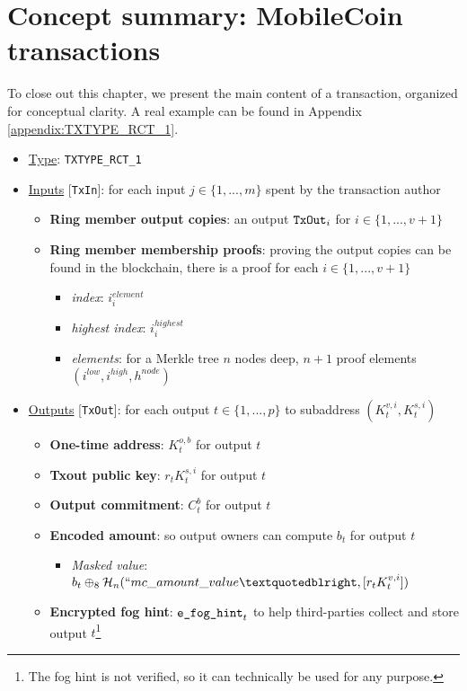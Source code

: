 \newpage
\section{Concept summary: MobileCoin transactions}
\label{sec:transaction_summary}

To close out this chapter, we present the main content of a transaction, organized for conceptual clarity. A real example can be found in Appendix \ref{appendix:TXTYPE_RCT_1}.

\begin{itemize}
    \item \underline{Type}: {\tt TXTYPE\_RCT\_1}
    \item \underline{Inputs} [{\tt TxIn}]: for each input $j \in \{1,...,m\}$ spent by the transaction author
    \begin{itemize}
        \item \textbf{Ring member output copies}: an output $\textrm{{\tt TxOut}}_i$ for $i \in \{1,...,v+1\}$
        \item \textbf{Ring member membership proofs}: proving the output copies can be found in the blockchain, there is a proof for each $i \in \{1,...,v+1\}$
        \begin{itemize}
            \item \textit{index}: $i^{element}_i$
            \item \textit{highest index}: $i^{highest}_i$
            \item \textit{elements}: for a Merkle tree $n$ nodes deep, $n+1$ proof elements $(i^{low}, i^{high}, h^{node})$
        \end{itemize}
    \end{itemize}

    \item \underline{Outputs} [{\tt TxOut}]: for each output $t \in \{1,...,p\}$ to subaddress $(K^{v,i}_t,K^{s,i}_t)$
    \begin{itemize}
        \item \textbf{One-time address}: $K^{o,b}_t$ for output $t$
        \item \textbf{Txout public key}: $r_t K^{s,i}_t$ for output $t$
        \item \textbf{Output commitment}: $C^{b}_t$ for output $t$
        \item \textbf{Encoded amount}: so output owners can compute $b_t$ for output $t$
        \begin{itemize}
            \item \textit{Masked value}: $b_t \oplus_8 \mathcal{H}_n(``mc\_amount\_value”, [r_t K^{v,i}_t])$
        \end{itemize}
        \item \textbf{Encrypted fog hint}: $\textrm{\tt e\_fog\_hint}_t$ to help third-parties collect and store output $t$\footnote{The fog hint is not verified, so it can technically be used for any purpose.}
    \end{itemize}


\end{itemize}
